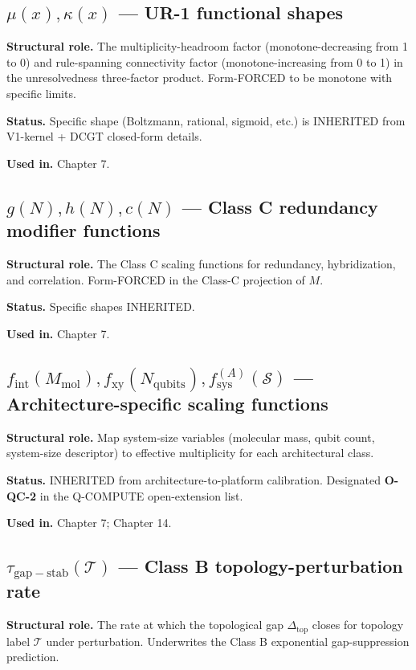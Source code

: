 \documentclass[11pt]{book}
\begin{document}
\subsection{$\mu(x), \kappa(x)$ — UR-1 functional shapes}

\textbf{Structural role.} The multiplicity-headroom factor (monotone-decreasing from 1 to 0) and rule-spanning connectivity factor (monotone-increasing from 0 to 1) in the unresolvedness three-factor product. Form-FORCED to be monotone with specific limits.

\textbf{Status.} Specific shape (Boltzmann, rational, sigmoid, etc.) is INHERITED from V1-kernel + DCGT closed-form details.

\textbf{Used in.} Chapter 7.

\subsection{$g(N), h(N), c(N)$ — Class C redundancy modifier functions}

\textbf{Structural role.} The Class C scaling functions for redundancy, hybridization, and correlation. Form-FORCED in the Class-C projection of $M$.

\textbf{Status.} Specific shapes INHERITED.

\textbf{Used in.} Chapter 7.

\subsection{$f_\mathrm{int}(M_\mathrm{mol}), f_\mathrm{xy}(N_\mathrm{qubits}), f_\mathrm{sys}^{(A)}(\mathcal{S})$ — Architecture-specific scaling functions}

\textbf{Structural role.} Map system-size variables (molecular mass, qubit count, system-size descriptor) to effective multiplicity for each architectural class.

\textbf{Status.} INHERITED from architecture-to-platform calibration. Designated \textbf{O-QC-2} in the Q-COMPUTE open-extension list.

\textbf{Used in.} Chapter 7; Chapter 14.

\subsection{$\tau_\mathrm{gap-stab}(\mathcal{T})$ — Class B topology-perturbation rate}

\textbf{Structural role.} The rate at which the topological gap $\Delta_\mathrm{top}$ closes for topology label $\mathcal{T}$ under perturbation. Underwrites the Class B exponential gap-suppression prediction.
\end{document}
